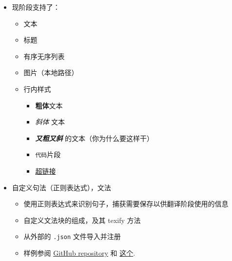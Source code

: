 \documentclass{ctexart}
\begin{document}
	\begin{itemize}
		\item 现阶段支持了：
		\begin{itemize}
			\item 文本
			\item 标题
			\item 有序无序列表
			\item 图片（本地路径）
			\item 行内样式
			\begin{itemize}
				\item \textbf{粗体}文本
				\item \textit{斜体} 文本
				\item \textbf{\textit{又粗又斜}} 的文本（你为什么要这样干）
				\item \texttt{代码}片段
				\item \href{https://http.cat/404}{超链接}
			\end{itemize}
		\end{itemize}
		\item 自定义句法（正则表达式），文法
		\begin{itemize}
			\item 使用正则表达式来识别句子，捕获需要保存以供翻译阶段使用的信息
			\item 自定义文法块的组成，及其 texify 方法
			\item 从外部的 \texttt{.json} 文件导入并注册
			\item 样例参阅 \href{https://github.com/TrickEye/md2latex-converter/blob/master/block_extensions.json}{GitHub repository} 和 \href{https://github.com/TrickEye/md2latex-converter/blob/master/sentence_extensions.json}{这个}.
		\end{itemize}
	\end{itemize}
	
\end{document}

